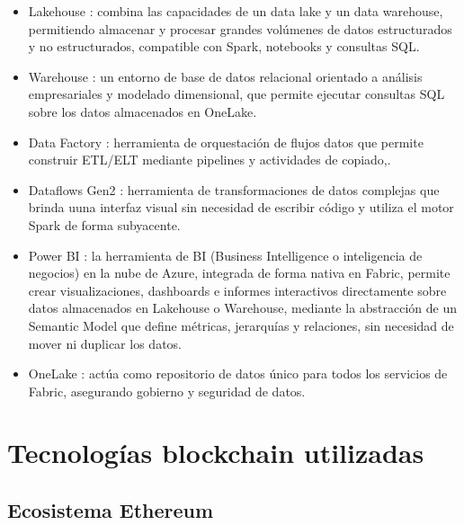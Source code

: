 \begin{itemize}
	\item Lakehouse \cite{fabric_lakehouse}: combina las capacidades de un data lake y un data warehouse, permitiendo almacenar y procesar grandes volúmenes de datos estructurados y no estructurados, compatible con Spark, notebooks y consultas SQL.
	\item Warehouse \cite{fabric_warehouse}: un entorno de base de datos relacional orientado a análisis empresariales y modelado dimensional, que permite ejecutar consultas SQL sobre los datos almacenados en OneLake.
	\item Data Factory \cite{fabric_datafactory}: herramienta de orquestación de flujos datos que permite construir ETL/ELT mediante pipelines y actividades de copiado,.
	\item Dataflows Gen2 \cite{fabric_dataflows}: herramienta de transformaciones de datos complejas que brinda uuna interfaz visual sin necesidad de escribir código y utiliza el motor Spark de forma subyacente.
	\item Power BI \cite{fabric_powerbi}: la herramienta de BI (Business Intelligence o inteligencia de negocios) en la nube de Azure, integrada de forma nativa en Fabric, permite crear visualizaciones, dashboards e informes interactivos directamente sobre datos almacenados en Lakehouse o Warehouse, mediante la abstracción de un Semantic Model que define métricas, jerarquías y relaciones, sin necesidad de mover ni duplicar los datos.
	\item OneLake \cite{fabric_onelake}: actúa como repositorio de datos único para todos los servicios de Fabric, asegurando gobierno y seguridad de datos. 
\end{itemize}



\section{Tecnologías blockchain utilizadas}



\subsection{Ecosistema Ethereum}

